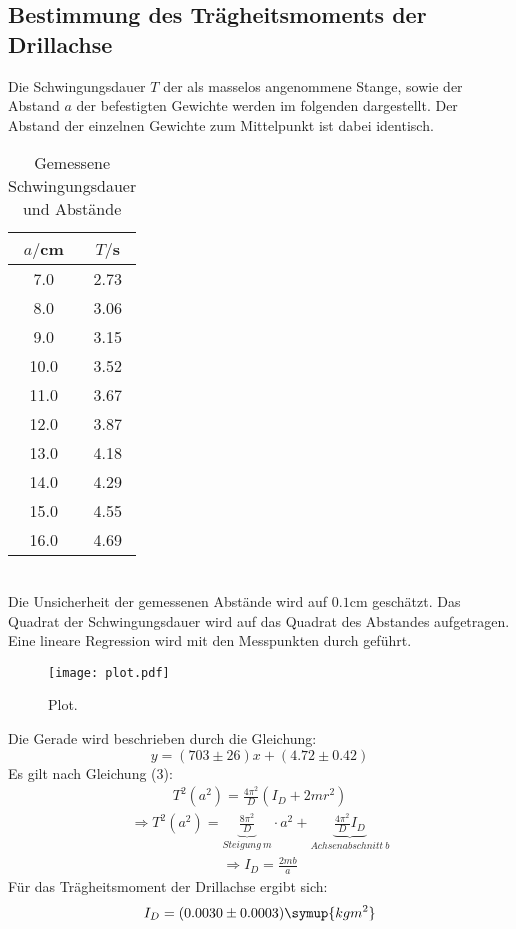 \subsection{Bestimmung des Trägheitsmoments der Drillachse}
Die Schwingungsdauer $T$ der als masselos angenommene Stange, sowie der Abstand $a$
der befestigten Gewichte werden im folgenden dargestellt. Der Abstand der einzelnen
Gewichte zum Mittelpunkt ist dabei identisch.
\begin{table}
  \centering
  \caption{Gemessene Schwingungsdauer und Abstände}
  \label{tab:Gemessene Schwingungsdauer und Abstände}
  \begin{tabular}{c c}
    \toprule
    $a/$cm & $T/$s \\
    \midrule
     7.0 & 2.73 \\
     8.0 & 3.06 \\
     9.0 & 3.15 \\
    10.0 & 3.52 \\
    11.0 & 3.67 \\
    12.0 & 3.87 \\
    13.0 & 4.18 \\
    14.0 & 4.29 \\
    15.0 & 4.55 \\
    16.0 & 4.69 \\
    \bottomrule
  \end{tabular}
\end{table} \\

Die Unsicherheit der gemessenen Abstände wird auf $0.1$cm geschätzt.
Das Quadrat der Schwingungsdauer wird auf das Quadrat des Abstandes
aufgetragen. Eine lineare Regression wird mit den Messpunkten durch geführt.

\begin{figure}
  \centering
  \texttt{[image: plot.pdf]}
  \caption{Plot.}
  \label{fig:plot}
\end{figure}

Die Gerade wird beschrieben durch die Gleichung:
\begin{equation}
  y = (703 \pm 26)x + (4.72 \pm 0.42)
\end{equation}
Es gilt nach Gleichung (3):
\begin{align}
  T^2(a^2) = \frac{4\pi^2}{D}(I_D + 2mr^2)
\end{align}
\begin{align}
  \Rightarrow T^2(a^2) = \underbrace{\frac{8\pi^2}{D}}_{Steigung \: m} \cdot a^2 + \underbrace{\frac{4\pi^2}{D}I_D}_{Achsenabschnitt \: b}
\end{align}
\begin{align}
  \Rightarrow I_D = \frac{2mb}{a}
\end{align}
Für das Trägheitsmoment der Drillachse ergibt sich:
\begin{equation}
  I_D = (0.0030 \pm 0.0003) \symup{kgm^2}
\end{equation}

